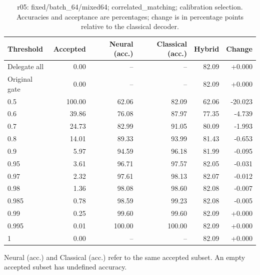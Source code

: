 \begin{table}[htbp]
\centering\small
\setlength{\tabcolsep}{3pt}
\caption{r05: fixed/batch\_64/mixed64; correlated\_matching; calibration selection. Accuracies and acceptance are percentages; change is in percentage points relative to the classical decoder.}
\begin{tabular}{lrrrrr}
\toprule
Threshold & Accepted & Neural (acc.) & Classical (acc.) & Hybrid & Change \\
\midrule
Delegate all & 0.00 & -- & -- & 82.09 & +0.000 \\
Original gate & 0.00 & -- & -- & 82.09 & +0.000 \\
0.5 & 100.00 & 62.06 & 82.09 & 62.06 & -20.023 \\
0.6 & 39.86 & 76.08 & 87.97 & 77.35 & -4.739 \\
0.7 & 24.73 & 82.99 & 91.05 & 80.09 & -1.993 \\
0.8 & 14.01 & 89.33 & 93.99 & 81.43 & -0.653 \\
0.9 & 5.97 & 94.59 & 96.18 & 81.99 & -0.095 \\
0.95 & 3.61 & 96.71 & 97.57 & 82.05 & -0.031 \\
0.97 & 2.32 & 97.61 & 98.13 & 82.07 & -0.012 \\
0.98 & 1.36 & 98.08 & 98.60 & 82.08 & -0.007 \\
0.985 & 0.78 & 98.59 & 99.23 & 82.08 & -0.005 \\
0.99 & 0.25 & 99.60 & 99.60 & 82.09 & +0.000 \\
0.995 & 0.01 & 100.00 & 100.00 & 82.09 & +0.000 \\
1 & 0.00 & -- & -- & 82.09 & +0.000 \\
\bottomrule
\end{tabular}
\par\smallskip\footnotesize Neural (acc.) and Classical (acc.) refer to the same accepted subset. An empty accepted subset has undefined accuracy.
\end{table}
